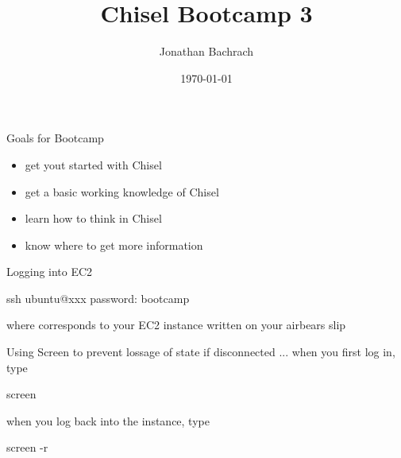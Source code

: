 \documentclass[xcolor=pdflatex,dvipsnames,table]{beamer}
\title{Chisel Bootcamp 3}
\author{Jonathan Bachrach}
\date{\today}
\institute[UC Berkeley]{EECS UC Berkeley}
\begin{document}
\begin{frame}
\titlepage
\end{frame}
\addtocounter{framenumber}{-1}

% 
% 
% 

\begin{frame}[fragile]{Goals for Bootcamp}

\begin{itemize}
\item get yout started with Chisel
\item get a basic working knowledge of Chisel
\item learn how to think in Chisel
\item know where to get more information
\end{itemize}

\end{frame}

\begin{frame}[fragile]{Logging into EC2}

\begin{scala}
ssh ubuntu@xxx
password: bootcamp
\end{scala}
\noindent
where  corresponds to your EC2 instance written on your airbears slip

\end{frame}

\begin{frame}[fragile]{Using Screen}
to prevent lossage of state if disconnected ... when you first log in, type
\begin{scala}
screen
\end{scala}

when you log back into the instance, type
\begin{scala}
screen -r
\end{scala}

\end{frame}
\end{document}
